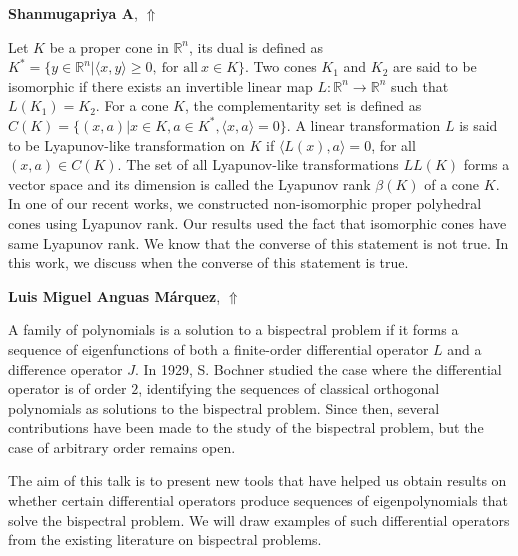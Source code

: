 \documentclass[ILAS2025-program.tex]{subfiles}
\begin{document}
\hypertarget{down0423}{}\begin{ilasabstract}
    
\textbf{Shanmugapriya A},  \hfill \hyperlink{up0423}{$\Uparrow$}
    
    
\mtskip
    Let $K$ be a proper cone in $\mathbb{R}^n$, its dual is defined as $K^*=\{y\in \mathbb{R}^n|\langle x,y\rangle\geq 0, ~\text{for all}~ x\in K\}$. Two cones $K_1$ and $K_2$ are said to be isomorphic if there exists an invertible linear map $L:\mathbb{R}^n\rightarrow \mathbb{R}^n$ such that  $L(K_1)=K_2$. For a cone $K$, the complementarity set is defined as $C(K)=\{(x,a)|x\in K, a\in K^*,\langle x,a \rangle=0\}$. A linear transformation $L$ is said to be Lyapunov-like transformation on $K$ if $\langle L(x), a \rangle=0$, for all $(x,a)\in C(K)$. The set of all Lyapunov-like transformations $LL(K)$ forms a vector space and its dimension is called the Lyapunov rank $\beta(K)$ of a cone $K$. In one of our recent works, we constructed non-isomorphic proper polyhedral cones using Lyapunov rank. Our results used the fact that isomorphic cones have same Lyapunov rank.  We know that the converse of this statement is not true. In this work, we discuss  when the converse of this statement is true. 

\end{ilasabstract}
    

\hypertarget{down0401}{}\begin{ilasabstract}
    
\textbf{Luis Miguel Anguas Márquez},  \hfill \hyperlink{up0401}{$\Uparrow$}
    
    
\mtskip
    A family of polynomials is a solution to a bispectral problem if it forms a sequence of eigenfunctions of both a finite-order differential operator $L$ and a difference operator $J$. In 1929, S. Bochner studied the case where the differential operator is of order $2$, identifying the sequences of classical orthogonal polynomials as solutions to the bispectral problem. Since then, several contributions have been made to the study of the bispectral problem, but the case of arbitrary order remains open.

The aim of this talk is to present new tools that have helped us obtain results on whether certain differential operators produce sequences of eigenpolynomials that solve the bispectral problem. We will draw examples of such differential operators from the existing literature on bispectral problems.
\end{ilasabstract}
    
\end{document}
